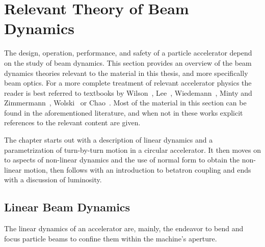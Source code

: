 \chapter{Relevant Theory of Beam Dynamics}
\label{chapter:Theory} %


The design, operation, performance, and safety of a particle accelerator depend on the study of beam dynamics.
This section provides an overview of the beam dynamics theories relevant to the material in this thesis, and more specifically beam optics.
For a more complete treatment of relevant accelerator physics the reader is best referred to textbooks by Wilson~\cite{BOOK:Wilson:Introcution_Particle_Accelerators}, Lee~\cite{BOOK:Lee:Accelerator_physics}, Wiedemann~\cite{BOOK:Wiedemann:Particle_Accelerator_Physics}, Minty and Zimmermann~\cite{BOOK:Minty:Measurements_Control_Charged_Particle_Beams}, Wolski~\cite{BOOK:Wolski:Beam_dynamics} or Chao~\cite{BOOK:Chao:Handbook_Accelerator_Physics_Engineering, BOOK:Chao:Collective_instabilities}.
Most of the material in this section can be found in the aforementioned literature, and when not in these works explicit references to the relevant content are given.

The chapter starts out with a description of linear dynamics and a parametrization of turn-by-turn motion in a circular accelerator.
It then moves on to aspects of non-linear dynamics and the use of normal form to obtain the non-linear motion, then follows with an introduction to betatron coupling and ends with a discussion of luminosity.


\section{Linear Beam Dynamics}
\label{section:linear_beam_dynamics}

The linear dynamics of an accelerator are, mainly, the endeavor to bend and focus particle beams to confine them within the machine's aperture.

